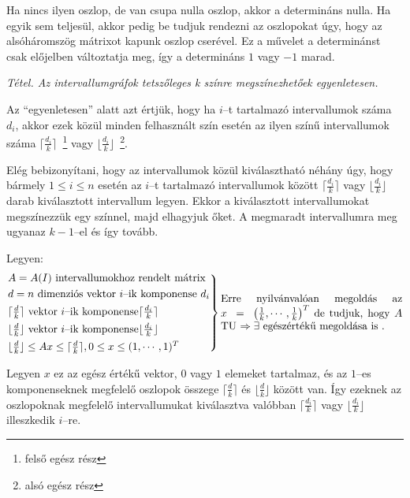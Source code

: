 Ha nincs ilyen oszlop, de van csupa nulla oszlop, akkor a determináns nulla. Ha
egyik sem teljesül, akkor pedig be tudjuk rendezni az oszlopokat úgy, hogy az
alsóháromszög mátrixot kapunk oszlop cserével. Ez a művelet a determinánst csak
előjelben változtatja meg, így a determináns $1$ vagy $-1$ marad.
\vspace{0.4cm}

\emph{Tétel. Az intervallumgráfok tetszőleges k színre megszínezhetőek
	egyenletesen.}
\vspace{0.4cm}

Az ``egyenletesen'' alatt azt értjük, hogy ha $i$--t tartalmazó intervallumok
száma $d_i$, akkor ezek közül minden felhasznált szín esetén az ilyen színű
intervallumok száma $\lceil \frac{d_i}{k} \rceil$~\footnote{felső egész rész}
vagy $\lfloor \frac{d_i}{k} \rfloor$~\footnote{alsó egész rész}.

Elég bebizonyítani, hogy az intervallumok közül kiválasztható néhány úgy, hogy
bármely $1 \leq i \leq n$ esetén az $i$--t tartalmazó intervallumok között
$\lceil \frac{d_i}{k} \rceil$ vagy $\lfloor \frac{d_i}{k} \rfloor$ darab
kiválasztott intervallum legyen. Ekkor a kiválasztott intervallumokat
megszínezzük egy színnel, majd elhagyjuk őket. A megmaradt intervallumra meg
ugyanaz $k-1$--el és így tovább.

Legyen:
\[\begin{rcases}
		A=A(I) \mbox{ intervallumokhoz rendelt mátrix}                                                 \\
		d = n \text{ dimenziós vektor } i \text{--ik komponense } d_i                                  \\
		\lceil \frac{d}{k} \rceil \text{ vektor } i \text{--ik komponense} \lceil \frac{d_i}{k} \rceil \\
		\lfloor \frac{d}{k} \rfloor \text{ vektor } i \text{--ik komponense} \lfloor
		\frac{d_i}{k} \rfloor                                                                          \\
		\lfloor \frac{d}{k} \rfloor \leq Ax \leq \lceil \frac{d}{k} \rceil, 0 \leq x
		\leq (1,\cdots, 1)^T\end{rcases} \parbox[L]{6cm}{Erre nyilvánvalóan megoldás az
$x~=~\left( \frac{1}{k}, \cdots, \frac{1}{k} \right)^T$ de tudjuk, hogy $A$ TU
$\Rightarrow \exists$ egészértékű megoldása is .} %
\]

Legyen $x$ ez az egész értékű vektor, $0$ vagy $1$ elemeket tartalmaz, és az
$1$--es komponenseknek megfelelő oszlopok összege $\lceil \frac{d}{k} \rceil$ és
$ \lfloor \frac{d}{k} \rfloor$ között van. Így ezeknek az oszlopoknak megfelelő
intervallumukat kiválasztva valóbban $\lceil \frac{d_i}{k} \rceil$ vagy $
	\lfloor \frac{d_i}{k} \rfloor$ illeszkedik $i$--re.

